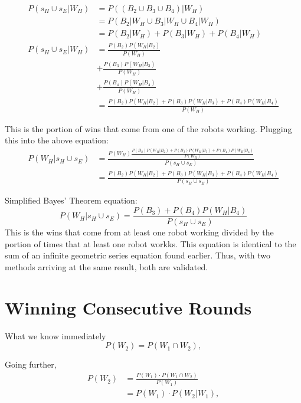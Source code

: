 \documentclass[11pt]{article}
\begin{document}
\begin{align*}
    P(s_H \cup s_E | W_H) &= P((B_2 \cup B_3 \cup B_4)| W_H)\\
    &= P(B_2 | W_H \cup B_3 | W_H \cup B_4 | W_H) \\
    &=P(B_2 | W_H) + P(B_3 | W_H) + P(B_4 | W_H)\\
    P(s_H \cup s_E | W_H) &= \frac{P(B_2) P(W_H | B_2)}{P(W_H)}\\
    &+ \frac{P(B_3)P(W_H | B_3)}{P(W_H)}\\
    &+ \frac{P(B_4)P(W_H | B_4)}{P(W_H)}\\
    &= \frac{P(B_2) P(W_H | B_2) + P(B_3)P(W_H | B_3) + P(B_4)P(W_H | B_4)}{P(W_H)}
\end{align*}

This is the portion of wins that come from one of the robots working. Plugging this 
into the above equation:
\begin{align*}
    P(W_H | s_H \cup s_E) &= \frac{P(W_H) \frac{P(B_2) P(W_H | B_2) + P(B_3)P(W_H | B_3) + P(B_4)P(W_H | B_4)}{P(W_H)}}{P(s_H \cup s_E)}\\
    &= \frac{P(B_2) P(W_H | B_2) + P(B_3)P(W_H | B_3) + P(B_4)P(W_H | B_4)}{P(s_H \cup s_E)}
\end{align*}

Simplified Bayes' Theorem equation:
\begin{equation*}
    P(W_H | s_H \cup s_E) = \frac{P(B_3) + P(B_4)P(W_H | B_4)}{P(s_H \cup s_E)}
\end{equation*}
This is the wins that come from at least one robot working divided by the portion of times that at least
one robot workks. This equation is identical to the sum of an infinite geometric series equation found earlier.
Thus, with two methods arriving at the same result, both are validated.

\section{Winning Consecutive Rounds}
What we know immediately
\begin{equation*}
    P(W_2) = P(W_1 \cap W_2),
\end{equation*}

Going further,
\begin{align*}
    P(W_2) &= \frac{P(W_1) \cdot P(W_1 \cap W_2)}{P(W_1)}\\
    &= P(W_1) \cdot P(W_2 | W_1),
\end{align*}
\end{document}
